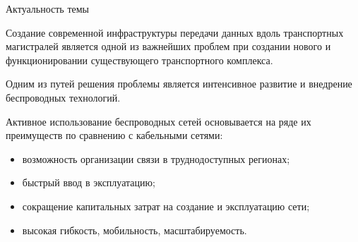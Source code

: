 \begin{frame}
    {Актуальность темы}
    \justifying

    Создание современной инфраструктуры передачи данных вдоль транспортных магистралей является одной из важнейших проблем при создании нового и функционировании существующего транспортного комплекса. 


    \bigskip

    Одним из путей решения проблемы является интенсивное развитие и внедрение беспроводных технологий.
    \bigskip


    Активное использование беспроводных сетей основывается на ряде их преимуществ по сравнению с кабельными сетями:
    \begin{itemize}
        \item возможность организации связи в труднодоступных регионах;
        \item быстрый ввод в эксплуатацию;
        \item сокращение капитальных затрат на создание и эксплуатацию сети; 
        \item высокая гибкость, мобильность, масштабируемость.
    \end{itemize}

    
\end{frame}


